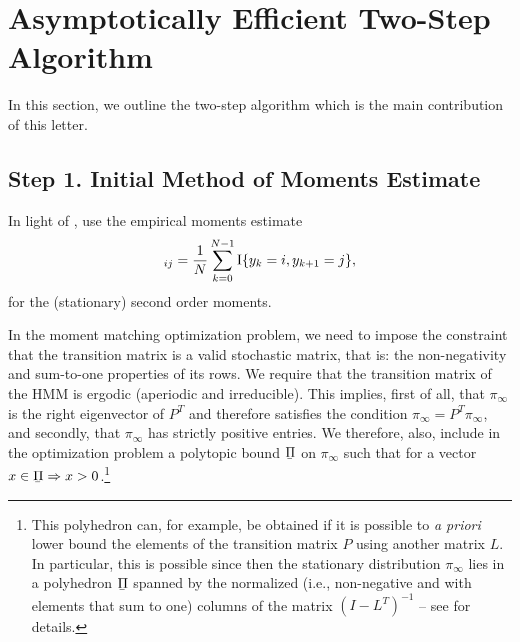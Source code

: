 \documentclass[journal]{IEEEtran}
\newcommand{\polylb}{\underaccent{\bar}{\Pi}}
\begin{document}
\section{Asymptotically Efficient Two-Step Algorithm}
\label{sec:algorithm}

In this section, we outline the two-step algorithm which is the main contribution of this
letter.


\subsection*{Step 1. Initial Method of Moments Estimate}

In light of , use the empirical moments estimate
\begin{equation}
    [\hat M_\infty]_{ij} = \frac{1}{N} \sum_{k=0}^{N-1} \ind{y_k = i,
    y_{k+1} = j},
    \label{eq:moment_estimator}
\end{equation}
for the (stationary) second order moments. 


In the moment matching optimization problem, we need to impose the constraint that the
transition matrix is a valid stochastic matrix, that is: the non-negativity and sum-to-one
properties of its rows. We require that the transition matrix of the HMM is ergodic
(aperiodic and irreducible). This implies, first of all, that $\pi_\infty$ is the right
eigenvector of $P^T$ and therefore satisfies the condition $\pi_\infty = P^T \pi_\infty$,
and secondly, that $\pi_\infty$ has strictly positive entries. We therefore, also, include
in the optimization problem a polytopic bound $\polylb$ on $\pi_\infty$ such that for
a vector $x \in \polylb \Rightarrow x > 0$.\footnote{This polyhedron can, for example, be
    obtained if it is possible to \emph{a priori} lower bound the elements of the
    transition matrix $P$ using another matrix $L$. In particular, this is possible since
    then the stationary distribution $\pi_\infty$ lies in a polyhedron $\polylb$ spanned
    by the normalized (i.e., non-negative and with elements that sum to one) columns of
    the matrix $(I-L^T)^{-1}$ -- see \cite{courtois_polyhedra_1985} for details.}
\end{document}
